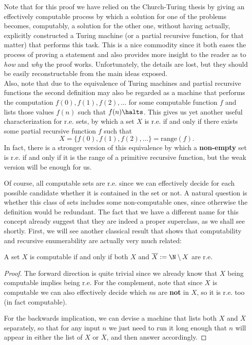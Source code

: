 \documentclass[../main.tex]{memoir}
\begin{document}
\begin{remark}
  Note that for this proof we have relied on the Church-Turing thesis by giving an effectively computable process by which a solution for one of the problems becomes, computably, a solution for the other one, without having actually, explicitly constructed a Turing machine (or a partial recursive function, for that matter) that performs this task. This is a nice commodity since it both eases the process of proving a statement and also provides more insight to the reader as to \textit{how} and \textit{why} the proof works. Unfortunately, the details are lost, but they should be easily reconstructable from the main ideas exposed. \\

  Also, note that due to the equivalence of Turing machines and partial recursive functions the second definition may also be regarded as a machine that performs the computation $f(0), f(1), f(2), \ldots$ for some computable function $f$ and lists those values $f(n)$ such that $f(n) \halts$. This gives us yet another useful characterization for r.e. sets, by which a set $X$ is r.e. if and only if there exists some partial recursive function $f$ such that
  \[ X = \{f(0), f(1), f(2), \ldots\} = \text{range}(f). \]
  In fact, there is a stronger version of this equivalence by which a \textbf{non-empty} set is r.e. if and only if it is the range of a primitive recursive function, but the weak version will be enough for us.
\end{remark}

Of course, all computable sets are r.e. since we can effectively decide for each possible candidate whether it is contained in the set or not. A natural question is whether this class of sets includes some non-computable ones, since otherwise the definition would be redundant. The fact that we have a different name for this concept already suggest that they are indeed a proper superclass, as we shall see shortly. First, we will see another classical result that shows that computability and recursive enumerability are actually very much related:

\begin{theorem}
  \label{thm:complementation}
  A set $X$ is computable if and only if both $X$ and $\overline{X} := \N \setminus X$ are r.e.
\end{theorem}
\begin{proof}
  The forward direction is quite trivial since we already know that $X$ being computable implies being r.e. For the complement, note that since $X$ is computable we can also effectively decide which $n$s are \textbf{not} in $X$, so it is r.e. too (in fact computable).

  For the backwards implication, we can devise a machine that lists both $X$ and $\overline{X}$ separately, so that for any input $n$ we just need to run it long enough that $n$ will appear in either the list of $X$ or $\overline{X}$, and then answer accordingly.
\end{proof}
\end{document}
